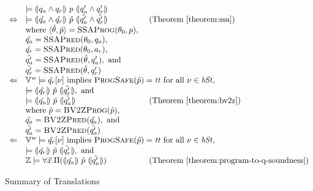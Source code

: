 \begin{figure}
\[
  \begin{array}{cll}
    & \models \hoaretriple{q_a \wedge q_r}{p}{q_a' \wedge q_r'}\\
    \Leftrightarrow
    & \models
      \hoaretriple{\hat{q_a} \wedge \hat{q_r}}
      {\hat{p}}
      {\hat{q_a'} \wedge \hat{q_r'}}
    & \textmd{ (Theorem~\ref{theorem:ssa})}\\
    &
      \textmd{where } \langle \hat{\theta}, \hat{p} \rangle =
      \textsc{SSAProg} (\theta_0, p), \\
    & \hat{q_a} = \textsc{SSAPred}(\theta_0, q_a), \\
    & \hat{q_r} = \textsc{SSAPred}(\theta_0, a_r), \\
    & \hat{q_a'} = \textsc{SSAPred}(\hat{\theta}, q_a'), \textmd{ and} \\
    & \hat{q_r'} = \textsc{SSAPred}(\hat{\theta}, q_r') \\
    \Leftarrow
    & \multicolumn{2}{l}{\BV^\wordsize \models \hat{q_r}[\bvst] \textmd{ implies } \textsc{ProgSafe}(\hat{p}) = \btt \textmd{ for all } \bvst \in \bvSt,} \\
    & \models \hoaretriple{\hat{q_r}}{\hat{p}}{\hat{q_r'}}, \textmd{ and } \\
    & \models \hoaretriple{\tilde{q_a}}{\tilde{p}}{\tilde{q_a'}}
    & \textmd{ (Theorem~\ref{theorem:bv2z})} \\
    & \textmd{where } \tilde{p} = \textsc{BV2ZProg}(\hat{p}), \\
    & \tilde{q_a} = \textsc{BV2ZPred}(\hat{q_a}), \textmd{ and} \\
    & \tilde{q_a'} = \textsc{BV2ZPred}(\hat{q_a'}) \\
    \Leftarrow
    & \multicolumn{2}{l}{\BV^\wordsize \models \hat{q_r}[\bvst] \textmd{ implies } \textsc{ProgSafe}(\hat{p}) = \btt \textmd{ for all } \bvst \in \bvSt,} \\
    & \models \hoaretriple{\hat{q_r}}{\hat{p}}{\hat{q_r'}}, \textmd{ and } \\
    & \bbfZ \models \forall \vx.
      \Pi (\hoaretriple{\tilde{q_a}}{\tilde{p}}{\tilde{q_a'}})
    & \textmd{ (Theorem~\ref{theorem:program-to-q-soundness})}
  \end{array}
\]
  \caption{Summary of Translations}
  \label{fig:summary}
\end{figure}

